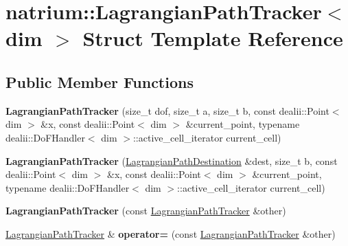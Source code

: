 \hypertarget{structnatrium_1_1LagrangianPathTracker}{
\section{natrium::LagrangianPathTracker$<$ dim $>$ Struct Template Reference}
\label{structnatrium_1_1LagrangianPathTracker}
}
\subsection*{Public Member Functions}
\begin{DoxyCompactItemize}
\item 
\hypertarget{structnatrium_1_1LagrangianPathTracker_a4cef3ea4a6c380c1b911a7a4aa7a3061}{
{\bfseries LagrangianPathTracker} (size\_\-t dof, size\_\-t a, size\_\-t b, const dealii::Point$<$ dim $>$ \&x, const dealii::Point$<$ dim $>$ \&current\_\-point, typename dealii::DoFHandler$<$ dim $>$::active\_\-cell\_\-iterator current\_\-cell)}
\label{structnatrium_1_1LagrangianPathTracker_a4cef3ea4a6c380c1b911a7a4aa7a3061}

\item 
\hypertarget{structnatrium_1_1LagrangianPathTracker_aa418c4972a979296b025296aeceaae63}{
{\bfseries LagrangianPathTracker} (\hyperlink{structnatrium_1_1LagrangianPathDestination}{LagrangianPathDestination} \&dest, size\_\-t b, const dealii::Point$<$ dim $>$ \&x, const dealii::Point$<$ dim $>$ \&current\_\-point, typename dealii::DoFHandler$<$ dim $>$::active\_\-cell\_\-iterator current\_\-cell)}
\label{structnatrium_1_1LagrangianPathTracker_aa418c4972a979296b025296aeceaae63}

\item 
\hypertarget{structnatrium_1_1LagrangianPathTracker_a74119f0e3f6e5cad12525428ee644ab8}{
{\bfseries LagrangianPathTracker} (const \hyperlink{structnatrium_1_1LagrangianPathTracker}{LagrangianPathTracker} \&other)}
\label{structnatrium_1_1LagrangianPathTracker_a74119f0e3f6e5cad12525428ee644ab8}

\item 
\hypertarget{structnatrium_1_1LagrangianPathTracker_a72393ed6331b93674718262307657a9d}{
\hyperlink{structnatrium_1_1LagrangianPathTracker}{LagrangianPathTracker} \& {\bfseries operator=} (const \hyperlink{structnatrium_1_1LagrangianPathTracker}{LagrangianPathTracker} \&other)}
\label{structnatrium_1_1LagrangianPathTracker_a72393ed6331b93674718262307657a9d}

\end{DoxyCompactItemize}
